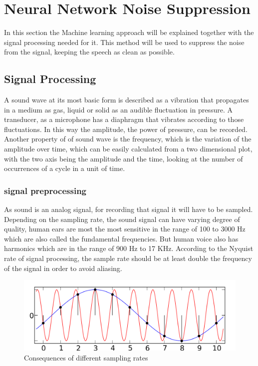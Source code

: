 \chapter{Neural Network Noise Suppression}\label{NeuralNetworkNoiseSuppression}
In this section the Machine learning approach will be explained together with the signal processing needed for it.
This method will be used to suppress the noise from the signal, keeping the speech as clean as possible.
\section{Signal Processing}
\label{SignalProcessing}
A sound wave at its most basic form is described as a vibration that propagates in a medium as gas, liquid or solid as an audible fluctuation in pressure. A transducer, as a microphone has a diaphragm that vibrates according to those fluctuations. In this way the amplitude, the power of pressure, can be recorded. Another property of of sound wave is the frequency, which is the variation of the amplitude over time, which can be easily calculated from a two dimensional plot, with the two axis being the amplitude and the time, looking at the number of occurrences of a cycle in a unit of time.
\subsection{signal preprocessing}
As sound is an analog signal, for recording that signal it will have to be sampled. Depending on the sampling rate, the sound signal can have varying degree of quality, human ears are most the most sensitive in the range of 100 to 3000 Hz which are also called the fundamental frequencies. But human voice also has harmonics which are in the range of 900 Hz to 17 KHz.
According to the Nyquist rate of signal processing, the sample rate should be at least double the frequency of the signal in order to avoid aliasing. 
\newpage
\begin{figure}[htp]
	\centering
	\includegraphics[width=1\textwidth]{Illustrations/AliasingSines.png}
	\caption{Consequences of different sampling rates}
	\label{fig:AliasingSines}
\end{figure}

